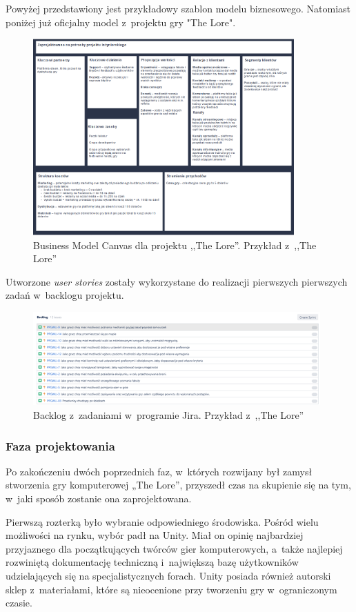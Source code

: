 \documentclass[oneside,polski,logo]{amuthesis}
\begin{document}
Powyżej przedstawiony jest przykładowy szablon modelu biznesowego. Natomiast poniżej już oficjalny model z~projektu gry "The Lore".

\begin{figure}[h]
	\centering
	\includegraphics[width=10cm]{images/hyps/BMC - The Lore.png}
	\caption{Business Model Canvas dla projektu ,,The Lore''. Przykład z~,,The Lore''}
\end{figure}

Utworzone \emph{user stories} zostały wykorzystane do realizacji pierwszych pierwszych zadań w~backlogu projektu.

\begin{figure}[h]
	\centering
	\includegraphics[width=11cm]{images/hyps/backlog.png}
	\caption{Backlog z~zadaniami w~programie Jira. Przykład z~,,The Lore''}
\end{figure}

\subsubsection{Faza projektowania}

Po zakończeniu dwóch poprzednich faz, w~których rozwijany był zamysł stworzenia gry komputerowej „The Lore”, przyszedł czas na skupienie się na tym, w~jaki sposób zostanie ona zaprojektowana.

Pierwszą rozterką było wybranie odpowiedniego środowiska. Pośród wielu możliwości na rynku, wybór padł na Unity. Miał on opinię najbardziej przyjaznego dla początkujących twórców gier komputerowych, a~także najlepiej rozwiniętą dokumentację techniczną i~największą bazę użytkowników udzielających się na specjalistycznych forach. Unity posiada również autorski sklep z~materiałami, które są nieocenione przy tworzeniu gry w~ograniczonym czasie.
\end{document}
